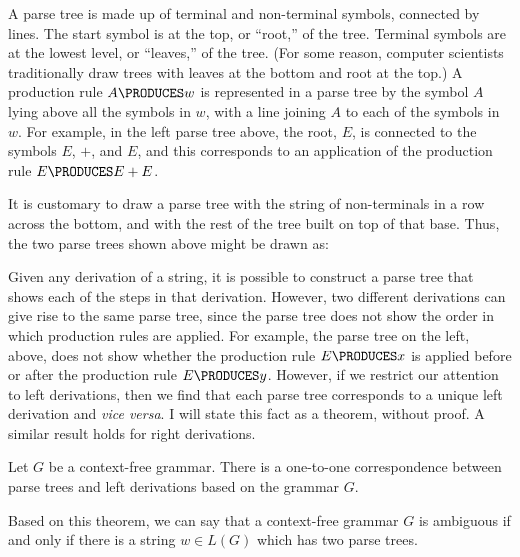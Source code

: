 \noindent A parse tree is made up of terminal and non-terminal symbols,
connected by lines.  The start symbol is at the top, or ``root,'' of
the tree.  Terminal symbols are at the lowest level, or ``leaves,'' of
the tree.  (For some reason, computer scientists traditionally
draw trees with leaves at the bottom and root at the top.)
A production rule $A\PRODUCES w$ is represented
in a parse tree by the symbol $A$ lying above all the symbols in $w$,
with a line joining $A$ to each of the symbols in $w$.  For
example, in the left parse tree above, the root,
$E$, is connected to the symbols $E$, $+$, and $E$, and this
corresponds to an application of the production rule
$E\PRODUCES E+E$.

It is customary to draw a parse tree with the string of non-terminals
in a row across the bottom, and with the rest of the tree built on
top of that base.  Thus, the two parse trees shown above might
be drawn as:

\bigskip
\centerline{}

Given any derivation of a string, it is possible to construct
a parse tree that shows each of the steps in that derivation.
However, two different derivations can give rise to the same
parse tree, since the parse tree does not show the order in
which production rules are applied.  For example, the parse
tree on the left, above, does not show whether the production
rule $E\PRODUCES x$ is applied before or after the production
rule $E\PRODUCES y$.  However, if we restrict our attention to left
derivations, then we find that each parse tree corresponds to
a unique left derivation and \textit{vice versa}.  I will state this
fact as a theorem, without proof.  A similar result holds for
right derivations.

\begin{theorem}
Let $G$ be a context-free grammar.  There is a one-to-one correspondence
between parse trees and left derivations based on the grammar $G$.
\end{theorem}

Based on this theorem, we can say that a context-free grammar $G$
is ambiguous if and only if there is a string $w\in L(G)$ which has
two parse trees.



